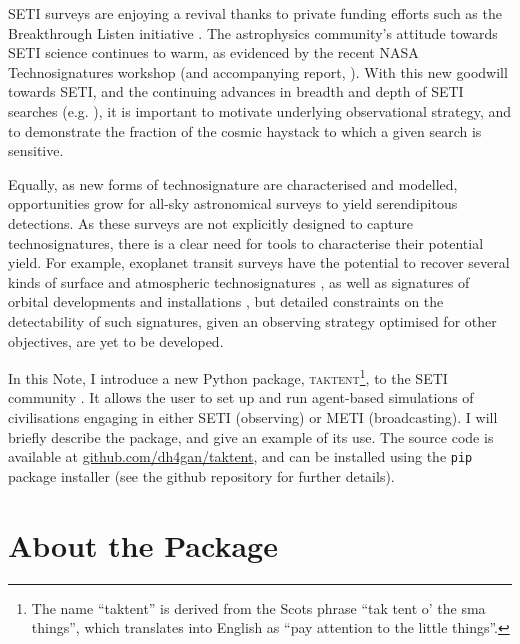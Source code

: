 \documentclass[RNAAS]{aastex62}
\begin{document}
SETI surveys are enjoying a revival thanks to private funding efforts such as the Breakthrough Listen initiative \citep{Isaacson2017}.  The astrophysics community's attitude towards SETI science continues to warm, as evidenced by the recent NASA Technosignatures workshop (and accompanying report, \citealt{Participants2018}).   With this new goodwill towards SETI, and the continuing advances in breadth and depth of SETI searches (e.g. \citealt{Rampadarath2012,Harp2016,Enriquez2017}), it is important to motivate underlying observational strategy, and to demonstrate the fraction of the cosmic haystack to which a given search is sensitive.  

Equally, as new forms of technosignature are characterised and modelled, opportunities grow for all-sky astronomical surveys to yield serendipitous detections.  As these surveys are not explicitly designed to capture technosignatures, there is a clear need for tools to characterise their potential yield.  For example, exoplanet transit surveys have the potential to recover several kinds of surface and atmospheric technosignatures \citep[e.g.][]{Lin2014,Korpela2015,Lingam2017a}, as well as signatures of orbital developments and installations \citep[e.g.][]{Socas-Navarro2018}, but detailed constraints on the detectability of such signatures, given an observing strategy optimised for other objectives, are yet to be developed.

In this Note, I introduce a new Python package, \textsc{taktent}\footnote{The name ``taktent'' is derived from the Scots phrase ``tak tent o' the sma things'', which translates into English as ``pay attention to the little things''.}, to the SETI community \citep{taktentDOI}.  It allows the user to set up and run agent-based simulations of civilisations engaging in either SETI (observing) or METI (broadcasting).  I will briefly describe the package, and give an example of its use.  The source code is available at \url{github.com/dh4gan/taktent}, and can be installed using the \texttt{pip} package installer (see the github repository for further details).

\section{About the Package}
\end{document}
